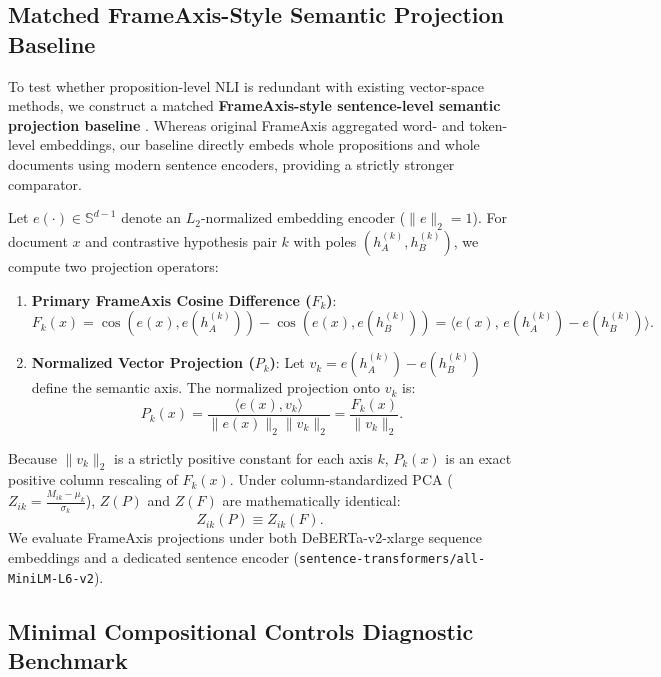 \subsection{Matched FrameAxis-Style Semantic Projection Baseline}
\label{sec:meth_frameaxis}

To test whether proposition-level NLI is redundant with existing vector-space methods, we construct a matched \textbf{FrameAxis-style sentence-level semantic projection baseline} \citep{kwak2021frameaxis}. Whereas original FrameAxis aggregated word- and token-level embeddings, our baseline directly embeds whole propositions and whole documents using modern sentence encoders, providing a strictly stronger comparator.

Let $e(\cdot) \in \mathbb{S}^{d-1}$ denote an $L_2$-normalized embedding encoder ($\|e\|_2 = 1$). For document $x$ and contrastive hypothesis pair $k$ with poles $(h_A^{(k)}, h_B^{(k)})$, we compute two projection operators:
\begin{enumerate}
    \item \textbf{Primary FrameAxis Cosine Difference ($F_k$)}:
    \begin{equation}
        F_k(x) = \cos(e(x), e(h_A^{(k)})) - \cos(e(x), e(h_B^{(k)})) = \langle e(x),\, e(h_A^{(k)}) - e(h_B^{(k)}) \rangle.
    \end{equation}
    \item \textbf{Normalized Vector Projection ($P_k$)}: Let $v_k = e(h_A^{(k)}) - e(h_B^{(k)})$ define the semantic axis. The normalized projection onto $v_k$ is:
    \begin{equation}
        P_k(x) = \frac{\langle e(x), v_k \rangle}{\|e(x)\|_2 \|v_k\|_2} = \frac{F_k(x)}{\|v_k\|_2}.
    \end{equation}
\end{enumerate}
Because $\|v_k\|_2$ is a strictly positive constant for each axis $k$, $P_k(x)$ is an exact positive column rescaling of $F_k(x)$. Under column-standardized PCA ($Z_{ik} = \frac{M_{ik} - \mu_k}{\sigma_k}$), $Z(P)$ and $Z(F)$ are mathematically identical:
\begin{equation}
    Z_{ik}(P) \equiv Z_{ik}(F).
\end{equation}
We evaluate FrameAxis projections under both DeBERTa-v2-xlarge sequence embeddings and a dedicated sentence encoder (\texttt{sentence-transformers/all-MiniLM-L6-v2}).

\subsection{Minimal Compositional Controls Diagnostic Benchmark}
\label{sec:meth_compositional}

